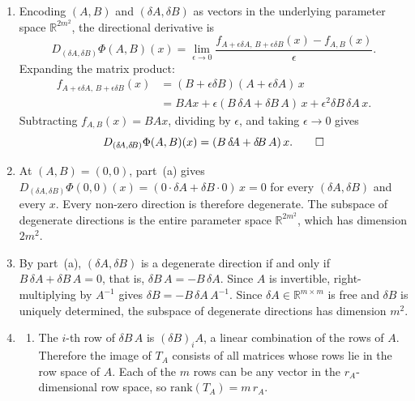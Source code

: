 \documentclass[11pt]{article}
\newcommand{\R}{\mathbb{R}}
\newcommand{\rank}{\mathrm{rank}}
\begin{document}
\begin{solution}
\begin{enumerate}
    \item
        Encoding $(A, B)$ and $(\delta\!A, \delta\!B)$ as vectors in the underlying parameter space $\R^{2m^2}$, the directional derivative is
        \begin{equation*}
            D_{(\delta\!A, \delta\!B)} \Phi(A, B)(x)
            = \lim_{\epsilon \to 0}
                \frac{
                    f_{A + \epsilon\delta\!A,\, B + \epsilon\delta\!B}(x)
                    - f_{A,B}(x)
                }{\epsilon}.
        \end{equation*}
        Expanding the matrix product:
        \begin{align*}
            f_{A + \epsilon\delta\!A,\, B + \epsilon\delta\!B}(x)
            &= (B + \epsilon\delta\!B)(A + \epsilon\delta\!A)\,x
        \\  &= BAx
                + \epsilon(B\,\delta\!A + \delta\!B\, A)\,x
                + \epsilon^2 \delta\!B\,\delta\!A\, x.
        \end{align*}
        Subtracting $f_{A,B}(x) = BAx$, dividing by $\epsilon$, and taking $\epsilon \to 0$ gives
        \begin{equation*}
            D_{(\delta\!A, \delta\!B)} \Phi(A, B)(x)
            = (B\,\delta\!A + \delta\!B\, A)\,x. \qedhere
        \end{equation*}

    \item
        At $(A, B) = (0, 0)$, part~(a) gives
            $D_{(\delta\!A, \delta\!B)} \Phi(0, 0)(x)
            = (0 \cdot \delta\!A + \delta\!B \cdot 0)\,x = 0$
        for every $(\delta\!A, \delta\!B)$ and every $x$.
        Every non-zero direction is therefore degenerate.
        The subspace of degenerate directions is the entire parameter space
        $\R^{2m^2}$, which has dimension $2m^2$.

    \item
        By part~(a), $(\delta\!A, \delta\!B)$ is a degenerate direction if and only if $B\,\delta\!A + \delta\!B\, A = 0$, that is, $\delta\!B\, A = -B\,\delta\!A$. Since $A$ is invertible, right-multiplying by $A^{-1}$ gives $\delta\!B = -B\,\delta\!A\, A^{-1}$.
        Since $\delta\!A \in \R^{m \times m}$ is free and $\delta\!B$ is
        uniquely determined, the subspace of degenerate directions has
        dimension $m^2$.

    \item
    \begin{enumerate}
        \item
            The $i$-th row of $\delta\!B\, A$ is
                $(\delta\!B)_i A$,
            a linear combination of the rows of $A$.
            Therefore the image of $T_A$ consists of all matrices whose rows
            lie in the row space of $A$.
            Each of the $m$ rows can be any vector in the
            $r_A$-dimensional row space, so
                $\rank(T_A) = m\,r_A$.


\end{enumerate}
\end{enumerate}
\end{solution}
\end{document}
